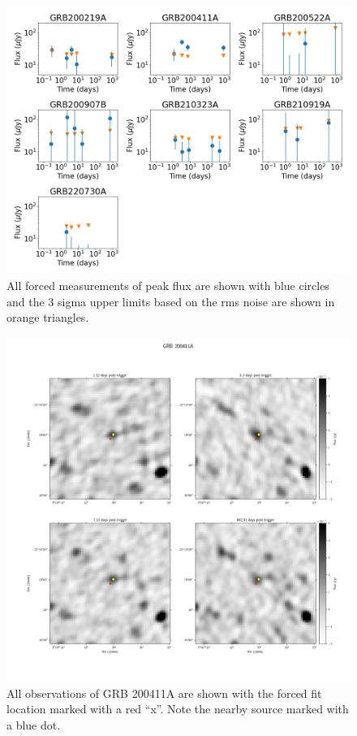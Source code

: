 \documentclass[12pt]{article}
\begin{document}
\begin{figure}
	\includegraphics[width=\textwidth]{plotboth.png}
	\caption{All forced measurements of peak flux are shown with blue circles and the 3 sigma upper limits based on the rms noise are shown in orange triangles.}
	\label{fig:allmeasurements}
\end{figure}

\begin{figure}
	\includegraphics[width=\textwidth]{GRB200411Aff.png}
	\caption{All observations of GRB 200411A are shown with the forced fit location marked with a red ``x''. Note the nearby source marked with a blue dot. }
	\label{fig:GRB200411Afield}
\end{figure}
\end{document}
